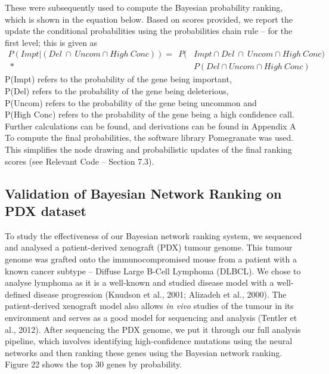 \documentclass{article}
\begin{document}
These were subsequently used to compute the Bayesian probability ranking, which is shown in the equation below. Based on scores provided, we report the update the conditional probabilities using the probabilities chain rule -- for the first level; this is given as \\
\begin{equation}
\begin{split}
P(Impt | (Del  \ \cap \ Uncom  \cap High\ Conc)) =  \ \ P(&Impt \cap Del  \ \cap \ Uncom \cap High \ Conc ) \\ \ * \ & P(Del  \cap Uncom  \cap High \ Conc )
\end{split}
\end{equation}
\tiny
\indent
P(Impt) refers to the probability of the gene being important,\\
\indent P(Del) refers to the probability of the gene being deleterious,\\ 
\indent P(Uncom) refers to the probability of the gene being uncommon and\\  \indent P(High Conc) refers to the probability of the gene being a high confidence call.\\ \indent Further calculations can be found, and derivations can be found in Appendix A\\

\normalsize
\noindent
To compute the final probabilities, the software library Pomegranate was used. This simplifies the node drawing and probabilistic updates of the final ranking scores (see Relevant Code -- Section 7.3).
\subsection{Validation of Bayesian Network Ranking on PDX dataset}
To study the effectiveness of our Bayesian network ranking system, we sequenced and analysed a patient-derived xenograft (PDX) tumour genome. This tumour genome was grafted onto the immunocompromised mouse from a patient with a known cancer subtype -- Diffuse Large B-Cell Lymphoma (DLBCL). We chose to analyse lymphoma as it is a well-known and studied disease model with a well-defined disease progression (Knudson et al., 2001; Alizadeh et al., 2000). The patient-derived xenograft model also allows \textit{in vivo} studies of the tumour in its environment and serves as a good model for sequencing and analysis (Tentler et al., 2012). After sequencing the PDX genome, we put it through our full analysis pipeline, which involves identifying high-confidence mutations using the neural networks and then ranking these genes using the Bayesian network ranking. Figure 22 shows the top 30 genes by probability. 
\end{document}
